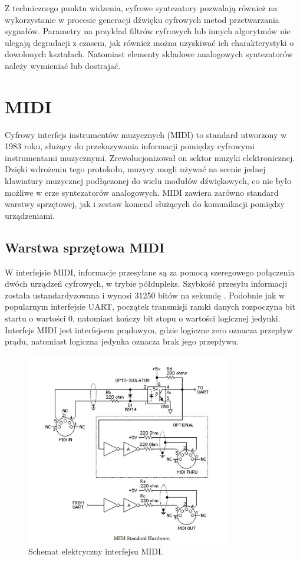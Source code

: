 
Z technicznego punktu widzenia, cyfrowe syntezatory pozwalają również na wykorzystanie w procesie generacji dźwięku cyfrowych metod przetwarzania sygnałów. Parametry na przykład filtrów cyfrowych lub innych algorytmów nie ulegają degradacji z czasem, jak również można uzyskiwać ich charakterystyki o dowolonych kształach. Natomiast elementy składowe analogowych syntezatorów należy wymieniać lub dostrajać.


\section{MIDI}
Cyfrowy interfejs instrumentów muzycznych (MIDI) to standard utworzony w 1983 roku, służący do przekazywania informacji pomiędzy cyfrowymi instrumentami muzycznymi. Zrewolucjonizował on sektor muzyki elektronicznej. Dzięki wdrożeniu tego protokołu, muzycy mogli używać na scenie jednej klawiatury muzycznej podłączonej do wielu modułów dźwiękowych, co nie było możliwe w erze syntezatorów analogowych. MIDI zawiera zarówno standard warstwy sprzętowej, jak i zestaw komend służących do komunikacji pomiędzy urządzeniami.

\subsection{Warstwa sprzętowa MIDI}
W interfejsie MIDI, informacje przesyłane są za pomocą szeregowego połączenia dwóch urządzeń cyfrowych, w trybie półdupleks. Szybkość przesyłu informacji została ustandardyzowana i wynosi 31250 bitów na sekundę \cite{dokumentacja_midi}. 
Podobnie jak w popularnym interfejsie UART, początek transmisji ramki danych rozpoczyna bit startu o wartości 0, natomiast kończy bit stopu o wartości logicznej jedynki. Interfejs MIDI jest interfejsem prądowym, gdzie logiczne zero oznacza przepływ prądu, natomiast logiczna jedynka oznacza brak jego przepływu.

\begin{figure}[H]
	\centering
	\includegraphics[width=9cm]{./grafiki/hardware_midi}
	\captionsetup{justification=centering}
	\caption{Schemat elektryczny interfejsu MIDI.}
	\label{rys:hardware_midi}
\end{figure}

